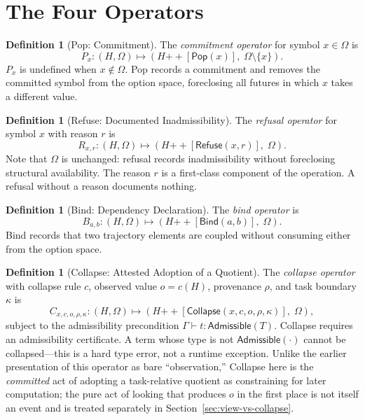 \documentclass[12pt, a4paper, openany]{book}
\theoremstyle{plain}
\theoremstyle{definition}
\newtheorem{definition}[theorem]{Definition}
\theoremstyle{remark}
\newcommand{\Pop}{\mathsf{Pop}}
\newcommand{\Refuse}{\mathsf{Refuse}}
\newcommand{\Bind}{\mathsf{Bind}}
\newcommand{\Collapse}{\mathsf{Collapse}}
\newcommand{\Adm}{\mathsf{Admissible}}
\begin{document}
\section{The Four Operators}

\begin{definition}[Pop: Commitment]
The \emph{commitment operator} for symbol $x \in \Omega$ is
\[
P_x : (H, \Omega) \mapsto (H \mathbin{++} [\Pop(x)],\; \Omega \setminus \{x\}).
\]
$P_x$ is undefined when $x \notin \Omega$. Pop records a commitment and removes
the committed symbol from the option space, foreclosing all futures in which $x$
takes a different value.
\end{definition}

\begin{definition}[Refuse: Documented Inadmissibility]
The \emph{refusal operator} for symbol $x$ with reason $r$ is
\[
R_{x,r} : (H, \Omega) \mapsto (H \mathbin{++} [\Refuse(x, r)],\; \Omega).
\]
Note that $\Omega$ is unchanged: refusal records inadmissibility without
foreclosing structural availability. The reason $r$ is a first-class component
of the operation. A refusal without a reason documents nothing.
\end{definition}

\begin{definition}[Bind: Dependency Declaration]
The \emph{bind operator} is
\[
B_{a,b} : (H, \Omega) \mapsto (H \mathbin{++} [\Bind(a, b)],\; \Omega).
\]
Bind records that two trajectory elements are coupled without consuming either
from the option space.
\end{definition}

\begin{definition}[Collapse: Attested Adoption of a Quotient]
The \emph{collapse operator} with collapse rule $c$, observed value $o = c(H)$,
provenance $\rho$, and task boundary $\kappa$ is
\[
C_{x,c,o,\rho,\kappa} : (H, \Omega) \mapsto
(H \mathbin{++} [\Collapse(x, c, o, \rho, \kappa)],\; \Omega),
\]
subject to the admissibility precondition $\Gamma \vdash t : \Adm(T)$.
Collapse requires an admissibility certificate. A term whose type is not
$\Adm(\cdot)$ cannot be collapsed---this is a hard type error, not a runtime
exception. Unlike the earlier presentation of this operator as bare
``observation,'' Collapse here is the \emph{committed} act of adopting a
task-relative quotient as constraining for later computation; the pure act of
looking that produces $o$ in the first place is not itself an event and is
treated separately in Section~\ref{sec:view-vs-collapse}.
\end{definition}
\end{document}
